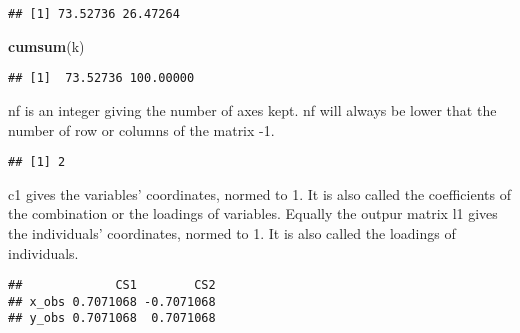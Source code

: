 \documentclass[]{article}
\newenvironment{Shaded}{\begin{snugshade}}{\end{snugshade}}
\newcommand{\KeywordTok}[1]{\textcolor[rgb]{0.13,0.29,0.53}{\textbf{#1}}}
\newcommand{\DecValTok}[1]{\textcolor[rgb]{0.00,0.00,0.81}{#1}}
\newcommand{\StringTok}[1]{\textcolor[rgb]{0.31,0.60,0.02}{#1}}
\newcommand{\OperatorTok}[1]{\textcolor[rgb]{0.81,0.36,0.00}{\textbf{#1}}}
\newcommand{\NormalTok}[1]{#1}
\begin{document}
\begin{Shaded}
\end{Shaded}

\begin{verbatim}
## [1] 73.52736 26.47264
\end{verbatim}

\begin{Shaded}
\begin{Highlighting}[]
\KeywordTok{cumsum}\NormalTok{(k)}
\end{Highlighting}
\end{Shaded}

\begin{verbatim}
## [1]  73.52736 100.00000
\end{verbatim}

nf is an integer giving the number of axes kept. nf will always be lower
that the number of row or columns of the matrix -1.

\begin{Shaded}
\end{Shaded}

\begin{verbatim}
## [1] 2
\end{verbatim}

c1 gives the variables' coordinates, normed to 1. It is also called the
coefficients of the combination or the loadings of variables. Equally
the outpur matrix l1 gives the individuals' coordinates, normed to 1. It
is also called the loadings of individuals.

\begin{Shaded}
\end{Shaded}

\begin{verbatim}
##             CS1        CS2
## x_obs 0.7071068 -0.7071068
## y_obs 0.7071068  0.7071068
\end{verbatim}
\end{document}
